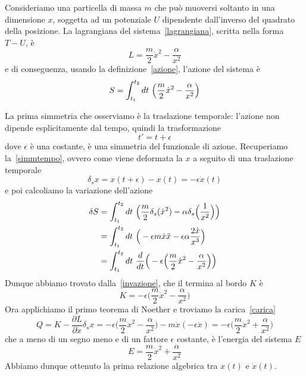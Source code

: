     \begin{example}
        Consideriamo una particella di massa $m$ che può muoversi soltanto in una dimensione $x$, soggetta ad un potenziale $U$ dipendente dall'inverso del quadrato della posizione. La lagrangiana del sistema~\eqref{lagrangiana}, scritta nella forma $T - U$, è
    \begin{equation} \label{lag1}
        L = \frac{m}{2} \dot x^2 - \frac{\alpha}{x^2} 
    \end{equation}
        e di conseguenza, usando la definizione~\eqref{azione}, l'azione del sistema è
    \begin{equation}
        S = \int_{t_1}^{t_2}dt~ \Big( \frac{m}{2} \dot x^2 - \frac{\alpha}{x^2} \Big)
    \end{equation}

        La prima simmetria che osserviamo è la traslazione temporale: l'azione non dipende esplicitamente dal tempo, quindi la trasformazione
    \begin{equation*}
        t' = t + \epsilon
    \end{equation*}
        dove $\epsilon$ è una costante, è una simmetria del funzionale di azione. Recuperiamo la~\eqref{simmtempo}, ovvero come viene deformata la $x$ a seguito di una traslazione temporale
    \begin{equation*}
        \delta_s x = x(t + \epsilon) - x(t) = - \epsilon \dot x(t)
    \end{equation*}
        e poi calcoliamo la variazione dell'azione
    \begin{equation*}
    \begin{aligned}
        \delta S & = \int_{t_1}^{t_2}dt~ \Big( \frac{m}{2} \delta_s (\dot x^2) - \alpha \delta_s \Big (\frac{1}{x^2} \Big) \Big) \\ & = \int_{t_1}^{t_2}dt~ \Big( - \epsilon m \dot x \ddot x - \epsilon \alpha \frac{2 \dot x}{x^3} \Big) \\ & = \int_{t_1}^{t_2}dt~ \frac{d}{dt} \Big( -\epsilon \Big( \frac{m}{2} \dot x^2 - \frac{\alpha}{x^2} \Big) \Big)
    \end{aligned}
    \end{equation*}
        Dunque abbiamo trovato dalla~\eqref{invazione}, che il termina al bordo $K$ è
    \begin{equation*}
        K = - \epsilon \Big (\frac{m}{2} \dot x^2 - \frac{\alpha}{x^2} \Big)
    \end{equation*}
        Ora applichiamo il primo teorema di Noether e troviamo la carica~\eqref{carica} 
    \begin{equation*}
        Q = K - \frac{\partial L}{\partial \dot x} \delta_s x = - \epsilon \Big (\frac{m}{2} \dot x^2 - \frac{\alpha}{x^2} \Big) - m \dot x (-\epsilon \dot x) = - \epsilon (\frac{m}{2} \dot x^2 + \frac{\alpha}{x^2} \Big)
    \end{equation*}
        che a meno di un segno meno e di un fattore $\epsilon$ costante, è l'energia del sistema $E$
    \begin{equation}\label{energia1}
        E = \frac{m}{2} \dot x^2 + \frac{\alpha}{x^2}
    \end{equation}
        Abbiamo dunque ottenuto la prima relazione algebrica tra $x(t)$ e $\dot x(t)$. 


\end{example}
